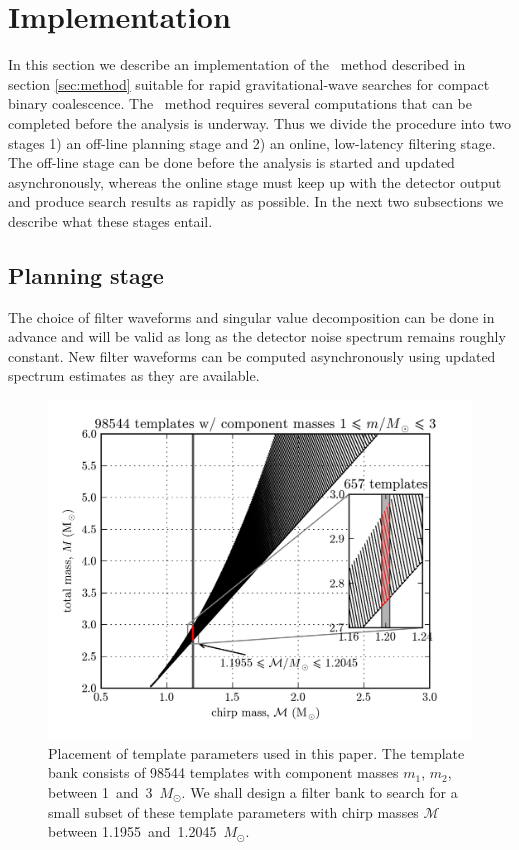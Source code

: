 \section{Implementation}
\label{sec:implementation}

In this section we describe an implementation of the \lloid\ method described
in section \ref{sec:method} suitable for rapid gravitational-wave
searches for compact binary coalescence.  The \lloid\ method requires several
computations that can be completed before the analysis is underway.  Thus
we divide the procedure into two stages 1) an off-line planning stage and 2) an
online, low-latency filtering stage.  The off-line stage can be done before the
analysis is started and updated asynchronously, whereas the online stage must
keep up with the detector output and produce search results as rapidly as
possible.  In the next two subsections we describe what these stages entail.

\subsection{Planning stage}

The choice of filter waveforms and singular value decomposition can be done in
advance and will be valid as long as the detector noise spectrum remains
roughly constant.  New filter waveforms can be computed asynchronously using
updated spectrum estimates as they are available. 

\begin{figure}[htbp]
	\label{fig:tmpltbank}
	\begin{center}
		\includegraphics[scale=0.75]{figures/tmpltbank.png}
		\caption{Placement of template parameters used in this paper.  The template bank consists of 98544 templates with component masses $m_1$, $m_2$, between 1~and~3~$M_\odot$.  We shall design a filter bank to search for a small subset of these template parameters with chirp masses $\mathcal M$ between 1.1955~and~1.2045~$M_\odot$.}
	\end{center}
\end{figure}

